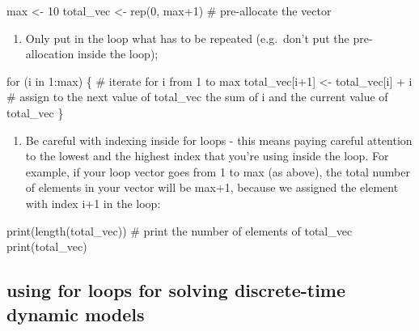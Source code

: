 \documentclass[
  letterpaper,
  DIV=11,
  numbers=noendperiod]{scrreprt}
\newenvironment{Shaded}{\begin{snugshade}}{\end{snugshade}}
\newcommand{\NormalTok}[1]{\textcolor[rgb]{0.00,0.23,0.31}{#1}}
\providecommand{\tightlist}{%
  \setlength{\itemsep}{0pt}\setlength{\parskip}{0pt}}\usepackage{longtable,booktabs,array}
\begin{document}
\begin{Shaded}
\begin{Highlighting}[]
\NormalTok{max \textless{}{-} 10 }
\NormalTok{total\_vec \textless{}{-} rep(0, max+1) \# pre{-}allocate the vector}
\end{Highlighting}
\end{Shaded}

\begin{enumerate}
\def\labelenumi{\arabic{enumi})}
\setcounter{enumi}{1}
\tightlist
\item
  Only put in the loop what has to be repeated (e.g.~don't put the
  pre-allocation inside the loop);
\end{enumerate}

\begin{Shaded}
\begin{Highlighting}[]
\NormalTok{for (i in 1:max) \{ \# iterate for i from 1 to max}
\NormalTok{  total\_vec[i+1] \textless{}{-} total\_vec[i] + i \# assign to the next value of total\_vec the sum of i and the current value of total\_vec}
\NormalTok{\}}
\end{Highlighting}
\end{Shaded}

\begin{enumerate}
\def\labelenumi{\arabic{enumi})}
\setcounter{enumi}{2}
\tightlist
\item
  Be careful with indexing inside for loops - this means paying careful
  attention to the lowest and the highest index that you're using inside
  the loop. For example, if your loop vector goes from 1 to max (as
  above), the total number of elements in your vector will be max+1,
  because we assigned the element with index i+1 in the loop:
\end{enumerate}

\begin{Shaded}
\begin{Highlighting}[]
\NormalTok{print(length(total\_vec)) \# print the number of elements of total\_vec}
\NormalTok{print(total\_vec)}
\end{Highlighting}
\end{Shaded}

\hypertarget{using-for-loops-for-solving-discrete-time-dynamic-models}{%
\subsection*{using for loops for solving discrete-time dynamic
models}\label{using-for-loops-for-solving-discrete-time-dynamic-models}}
\end{document}
